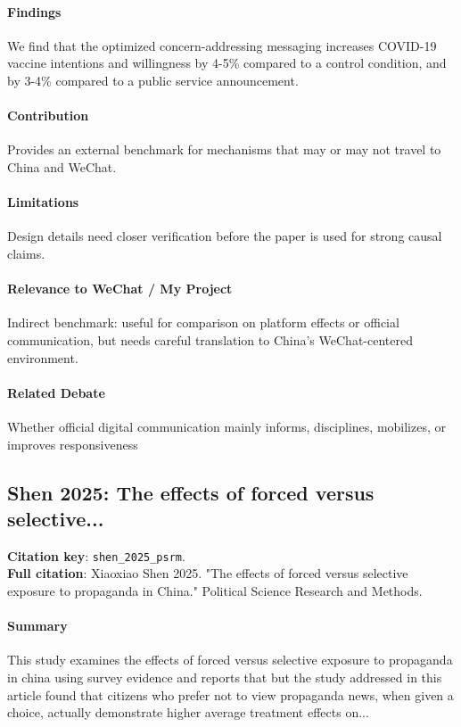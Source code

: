 \documentclass[12pt]{article}
\begin{document}
\paragraph{Findings} We find that the optimized concern-addressing messaging increases COVID-19 vaccine intentions and willingness by 4-5\% compared to a control condition, and by 3-4\% compared to a public service announcement.

\paragraph{Contribution} Provides an external benchmark for mechanisms that may or may not travel to China and WeChat.

\paragraph{Limitations} Design details need closer verification before the paper is used for strong causal claims.

\paragraph{Relevance to WeChat / My Project} Indirect benchmark: useful for comparison on platform effects or official communication, but needs careful translation to China's WeChat-centered environment.

\paragraph{Related Debate} Whether official digital communication mainly informs, disciplines, mobilizes, or improves responsiveness


\subsection{Shen 2025: The effects of forced versus selective...}
\textbf{Citation key}: \texttt{shen\_2025\_psrm}.\\
\textbf{Full citation}: Xiaoxiao Shen 2025. "The effects of forced versus selective exposure to propaganda in China." Political Science Research and Methods.

\paragraph{Summary} This study examines the effects of forced versus selective exposure to propaganda in china using survey evidence and reports that but the study addressed in this article found that citizens who prefer not to view propaganda news, when given a choice, actually demonstrate higher average treatment effects on...
\end{document}
